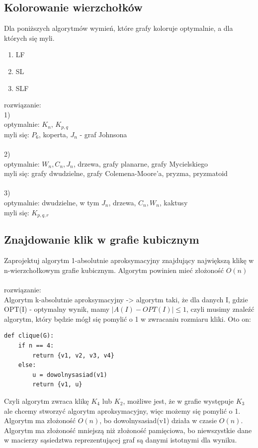 \documentclass{article}
\begin{document}
\subsection*{Kolorowanie wierzchołków}
Dla poniższych algorytmów wymień, które grafy koloruje optymalnie, a dla których się myli.
\begin{enumerate}
	\item LF
	\item SL
	\item SLF
\end{enumerate}
rozwiązanie: \\
1)\\
optymalnie: $K_n$, $K_{p,q}$ \\
myli się: $P_6$, koperta,  $J_n$ - graf Johnsona \\\\
2)\\
optymalnie: $W_n, C_n, J_n$, drzewa, grafy planarne, grafy Mycielskiego \\
myli się: grafy dwudzielne, grafy Colemena-Moore'a, pryzma,  pryzmatoid \\\\
3)\\
optymalnie: dwudzielne, w tym $J_n$, drzewa, $C_n, W_n$, kaktusy \\
myli się: $K_{p,q,r}$

\subsection*{Znajdowanie klik w grafie kubicznym}
Zaprojektuj algorytm 1-absolutnie aproksymacyjny znajdujący największą klikę w n-wierzchołkowym grafie kubicznym. Algorytm powinien mieć złożoność $O(n)$ \\\\rozwiązanie:\\
Algorytm k-absolutnie aproksymacyjny -> algorytm taki, że dla danych I, gdzie OPT(I) - optymalny wynik, mamy $|A(I) - OPT(I)| \leq 1$, czyli musimy znaleźć algorytm, 
który będzie mógł się pomylić o 1 w zwracaniu rozmiaru kliki. Oto on:

\begin{lstlisting}
def clique(G):
	if n == 4:
		return {v1, v2, v3, v4}
	else:
		u = dowolnysasiad(v1)
		return {v1, u}
\end{lstlisting}
Czyli algorytm zwraca klikę $K_4$ lub $K_2$,  możliwe jest, że w grafie występuje $K_3$ ale chcemy stworzyć algorytm aproksymacyjny, więc możemy się pomylić o 1.
Algorytm ma złożoność $O(n)$, bo dowolnysasiad(v1) działa w czasie $O(n)$. Algorytm ma złożoność mniejszą niż złożoność pamięciowa, bo niewszystkie dane w macierzy 
sąsiedztwa reprezentującej graf są danymi istotnymi dla wyniku.
\end{document}
